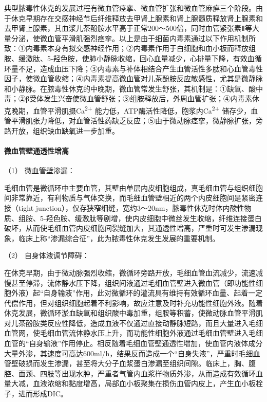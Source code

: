 典型脓毒性休克的发展过程有微血管痉挛、微血管扩张和微血管麻痹三个阶段。由于休克早期存在交感神经节后纤维释放去甲肾上腺素和肾上腺髓质释放肾上腺素和去甲肾上腺素，其血浆儿茶酚胺水平高于正常200～500倍，同时血管紧张素Ⅱ等大量分泌，使微血管平滑肌强烈痉挛。以上是由于细菌内毒素通过以下作用机制所致：①内毒素本身有拟交感神经作用；②内毒素作用于白细胞和血小板而释放组胺、缓激肽、5-羟色胺，使肺小静脉收缩，回心血量减少，心排量下降，有效血循环量不足，造成血压下降；③内毒素与补体相结合产生血管活性多肽和心血管毒性因子，使微血管收缩；④内毒素提高微血管对儿茶酚胺反应敏感性，尤其是微静脉和小静脉。在脓毒性休克的中晚期，微血管常发生舒张，其机制是：①缺氧、酸中毒；②β受体发生兴奋使微血管舒张；③组胺释放后，外周血管扩张；④内毒素休克晚期，血管平滑肌摄Ca\textsuperscript{2+}
能力低，ATP酶活性降低，胞浆内Ca\textsuperscript{2+}
储存少，血管平滑肌张力降低，对血管活性药缺乏反应；⑤由于微动脉痉挛，微静脉扩张，旁路开放，组织缺血缺氧进一步加重。

\paragraph{微血管壁通透性增高}

\hypertarget{text00057.htmlux5cux23CHP2-2-1-3-1-2-1}{}
（1） 微血管壁渗漏：

毛细血管是微循环中主要血管，其壁由单层内皮细胞组成，真毛细血管与组织细胞间非常靠近，有利物质与气体交换，而毛细血管壁相近的两个内皮细胞间是紧密连接（tight
junction），仅存狭窄细缝，宽约3～20nm，脓毒性休克时体内酸性物质、组胺、5-羟色胺、缓激肽等剧增，使内皮细胞中微丝发生收缩，纤维连接蛋白破坏，从而使毛细血管内皮细胞间裂缝加大，其通透性增高，严重时可发生渗漏现象，临床上称“渗漏综合征”，此为脓毒性休克发生发展的重要机制。

\hypertarget{text00057.htmlux5cux23CHP2-2-1-3-1-2-2}{}
（2） 自身体液调节障碍：

在休克早期，由于微动脉强烈收缩，微循环旁路开放，毛细血管血流减少，流速减慢甚至停滞，流体静水压下降，组织间液通过毛细血管壁进入微血管（即功能性细胞外液）起“自身输液”作用，此对微循环的灌流具有维持有效循环血量、起着一定代偿作用，但对组织细胞起着不利影响，故应注意及时补充功能性细胞外液。随着休克发展，微循环淤血缺氧和组织酸中毒加重，组胺等积蓄，使微动脉血管平滑肌对儿茶酚胺类反应性降低，造成血液不仅通过直接动静脉短路，而且大量进入毛细血管网，使毛细血管流体静水压上升，而功能性细胞外液通过毛细血管壁进入毛细血管的“自身输液”作用停止。相反随着毛细血管壁通透性增加，使血管内液体成分大量外渗，其速度可高达600ml/h，结果反而造成一个“自身失液”，严重时毛细血管壁破损而发生渗漏，甚至将大分子血浆蛋白渗漏至组织间隙。临床上，胸、腹腔、面颈、四肢等出现水肿，严重者气管内血浆样物质外渗，从而造成有效循环血量大减，血液浓缩和黏度增高，局部血小板聚集在损伤血管内皮上，产生血小板栓子，进而形成DIC。

